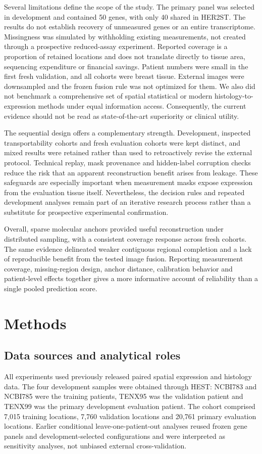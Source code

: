 Several limitations define the scope of the study. The primary panel was selected in development and contained 50 genes, with only 40 shared in HER2ST. The results do not establish recovery of unmeasured genes or an entire transcriptome. Missingness was simulated by withholding existing measurements, not created through a prospective reduced-assay experiment. Reported coverage is a proportion of retained locations and does not translate directly to tissue area, sequencing expenditure or financial savings. Patient numbers were small in the first fresh validation, and all cohorts were breast tissue. External images were downsampled and the frozen fusion rule was not optimized for them. We also did not benchmark a comprehensive set of spatial statistical or modern histology-to-expression methods under equal information access. Consequently, the current evidence should not be read as state-of-the-art superiority or clinical utility.

The sequential design offers a complementary strength. Development, inspected transportability cohorts and fresh evaluation cohorts were kept distinct, and mixed results were retained rather than used to retroactively revise the external protocol. Technical replay, mask provenance and hidden-label corruption checks reduce the risk that an apparent reconstruction benefit arises from leakage. These safeguards are especially important when measurement masks expose expression from the evaluation tissue itself. Nevertheless, the decision rules and repeated development analyses remain part of an iterative research process rather than a substitute for prospective experimental confirmation.

Overall, sparse molecular anchors provided useful reconstruction under distributed sampling, with a consistent coverage response across fresh cohorts. The same evidence delineated weaker contiguous regional completion and a lack of reproducible benefit from the tested image fusion. Reporting measurement coverage, missing-region design, anchor distance, calibration behavior and patient-level effects together gives a more informative account of reliability than a single pooled prediction score.

\section{Methods}
\subsection{Data sources and analytical roles}
All experiments used previously released paired spatial expression and histology data. The four development samples were obtained through HEST\cite{jaume2024}: NCBI783 and NCBI785 were the training patients, TENX95 was the validation patient and TENX99 was the primary development evaluation patient. The cohort comprised 7,015 training locations, 7,760 validation locations and 20,761 primary evaluation locations. Earlier conditional leave-one-patient-out analyses reused frozen gene panels and development-selected configurations and were interpreted as sensitivity analyses, not unbiased external cross-validation.

